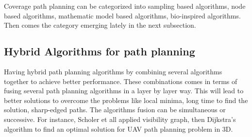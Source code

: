 

Coverage path planning can be categorized into sampling based algorithms, node based algorithms, mathematic model based algorithms, bio-inspired algorithms. Then comes the category emerging lately in the next subsection.

\subsection{Hybrid Algorithms for path planning}

%
Having hybrid path planning algorithms by combining several algorithms together to achieve better performance. These combinations comes in terms of fusing several path planning algorithms in a layer by layer way. This will lead to better solutions to overcome the problems like local minima, long time to find the solution, sharp-edged paths. The algorithms fusion can be simultaneous or successive. For instance, Scholer et all \cite{scholer2012generating} applied visibility graph, then Dijkstra’s algorithm to find an optimal solution for UAV path planning problem in 3D.


